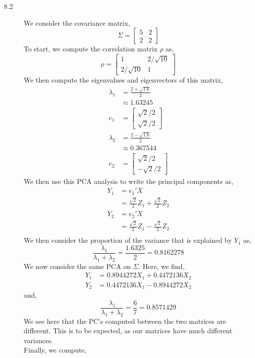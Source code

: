 \documentclass[letterpaper,10pt]{article}
\begin{document}
\begin{description}
\item[8.2] We consider the covariance matrix,
\[\Sigma= \begin{bmatrix}
5 & 2\\2 & 2
\end{bmatrix} \]
To start, we compute the correlation matrix $\rho$ as,
\[\rho=\begin{bmatrix}
1 & 2/\sqrt{10}\\2/\sqrt{10} & 1
\end{bmatrix} \]
We then compute the eigenvalues and eigenvectors of this matrix,
\begin{align*}
\lambda_1 &= \frac{2+\sqrt{1.6}}{2}\\
&\approx 1.63245\\
e_1 &= \begin{bmatrix}
\sqrt{2}/2\\\sqrt{2}/2
\end{bmatrix}\\
\lambda_2 &= \frac{2-\sqrt{1.6}}{2}\\
&\approx 0.367544\\
e_2 &= \begin{bmatrix}
\sqrt{2}/2\\-\sqrt{2}/2
\end{bmatrix}
\end{align*}
We then use this PCA analysis to write the principal components as,
\begin{align*}
Y_1 &= e_1'X\\
&=\frac{\sqrt{2}}{2}Z_1+\frac{\sqrt{2}}{2}Z_2\\
Y_2 &= e_2'X\\
&=\frac{\sqrt{2}}{2}Z_1-\frac{\sqrt{2}}{2}Z_2\\
\end{align*}
We then consider the proportion of the variance that is explained by $Y_1$ as,
\[\frac{\lambda_1}{\lambda_1+\lambda_2}=\frac{1.6325}{2}=0.8162278\]
We now consider the same PCA on $\Sigma$. Here, we find,
\begin{align*}
Y_1&=0.8944272X_1+0.4472136X_2\\
Y_2&=0.4472136X_1-0.8944272X_2
\end{align*}
and,
\[\frac{\lambda_1}{\lambda_1+\lambda_2}=\frac{6}{7}=0.8571429\]
We see here that the PC's computed between the two matrices are different. This is to be expected, as our matrices have much different variances.\\
Finally, we compute,
\begin{align*}

\end{align*}
\end{description}
\end{document}
